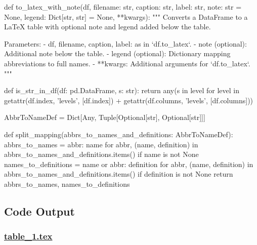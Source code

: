 \documentclass[11pt]{article}
\begin{document}
\begin{python}
def to_latex_with_note(df, filename: str, caption: str, label: str, note: str = None, legend: Dict[str, str] = None, **kwargs):
    """
    Converts a DataFrame to a LaTeX table with optional note and legend added below the table.

    Parameters:
    - df, filename, caption, label: as in `df.to_latex`.
    - note (optional): Additional note below the table.
    - legend (optional): Dictionary mapping abbreviations to full names.
    - **kwargs: Additional arguments for `df.to_latex`.
    """

def is_str_in_df(df: pd.DataFrame, s: str):
    return any(s in level for level in getattr(df.index, 'levels', [df.index]) + getattr(df.columns, 'levels', [df.columns]))

AbbrToNameDef = Dict[Any, Tuple[Optional[str], Optional[str]]]

def split_mapping(abbrs_to_names_and_definitions: AbbrToNameDef):
    abbrs_to_names = {abbr: name for abbr, (name, definition) in abbrs_to_names_and_definitions.items() if name is not None}
    names_to_definitions = {name or abbr: definition for abbr, (name, definition) in abbrs_to_names_and_definitions.items() if definition is not None}
    return abbrs_to_names, names_to_definitions

\end{python}



\subsection{Code Output}

\subsubsection*{\hyperlink{code-LaTeX Table Design-table-1-tex}{table\_1.tex}}
\end{document}
